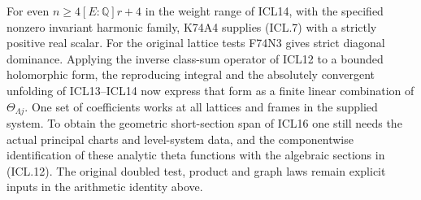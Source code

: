For even $n\ge 4[E:\mathbb Q]r+4$ in the weight range of ICL14,
with the specified nonzero invariant harmonic family, K74A4 supplies (ICL.7) with a
strictly positive real scalar. For the original lattice tests F74N3
gives strict diagonal dominance. Applying the inverse class-sum
operator of ICL12 to a bounded holomorphic form, the reproducing
integral and the absolutely convergent unfolding of ICL13--ICL14
now express that form as a finite linear combination of
$\Theta_{\Lambda j}$. One set of coefficients works at all lattices
and frames in the supplied system. To obtain the geometric
short-section span of ICL16 one still needs the actual principal
charts and level-system data, and the componentwise identification
of these analytic theta functions with the algebraic sections in
(ICL.12). The original doubled test, product and graph laws remain
explicit inputs in the arithmetic identity above.
